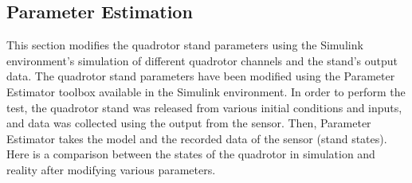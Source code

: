 \documentclass[conference]{IEEEtran}
\begin{document}
\subsection{Parameter Estimation}
This section modifies the quadrotor stand parameters using the Simulink environment's simulation of different quadrotor channels and the stand's output data.
The quadrotor stand parameters have been modified using the Parameter Estimator toolbox available in the Simulink environment.
In order to perform the test, the quadrotor stand was released from various initial conditions and inputs, and data was collected using the output from the sensor.
Then, Parameter Estimator takes the model and the recorded data of the sensor (stand states).
Here is a comparison between the states of the quadrotor in simulation and reality after modifying various parameters.

\end{document}

